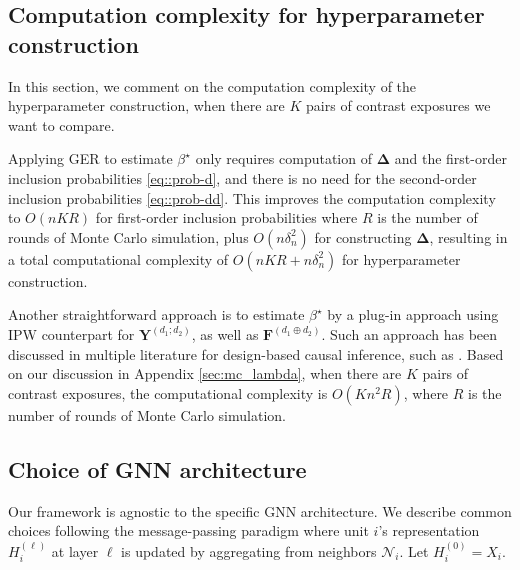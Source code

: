 \documentclass{article}
\theoremstyle{plain}
\theoremstyle{definition}
\theoremstyle{remark}
\newcommand{\bY}{\boldsymbol{Y}}
\newcommand{\bF}{\boldsymbol{F}}
\newcommand{\bDelta}{\boldsymbol{\Delta}}
\newcommand{\cN}{\mathcal{N}}
\newcommand{\bFaug}{\bF^{(d_1\oplus d_2)}}
\begin{document}
\subsection{Computation complexity for hyperparameter construction}\label{sec:computation}

In this section, we comment on the computation complexity of the hyperparameter construction, when there are $K$ pairs of contrast exposures we want to compare.

Applying GER to estimate $\beta^\star$ only requires computation of $\bDelta$ and the first-order inclusion probabilities \eqref{eq::prob-d}, and there is no need for the second-order inclusion probabilities \eqref{eq::prob-dd}. This improves the computation complexity to $O(nKR)$ for first-order inclusion probabilities where $R$ is the number of rounds of Monte Carlo simulation, plus $O(n \delta_n^2)$ for constructing $\bDelta$, resulting in a total computational complexity of $O(nKR + n \delta_n^2)$ for hyperparameter construction.

Another straightforward approach is to estimate $\beta^\star$ by a plug-in approach using IPW counterpart for $\bY^{(d_1;d_2)}$, as well as $\bFaug$. Such an approach has been discussed in multiple literature for design-based causal inference, such as \citet{middleton2018unified, chang2023design, lu2025design}. Based on our discussion in Appendix \ref{sec:mc_lambda}, when there are $K$ pairs of contrast exposures, the computational complexity is $O(K n^2 R)$, where $R$ is the number of rounds of Monte Carlo simulation. 

\subsection{Choice of GNN architecture}\label{sec:gnn_choices}

Our framework is agnostic to the specific GNN architecture. We describe common choices following the message-passing paradigm where unit $i$'s representation $H_i^{(\ell)}$ at layer $\ell$ is updated by aggregating from neighbors $\cN_i$. Let $H_i^{(0)} = X_i$.
\end{document}
